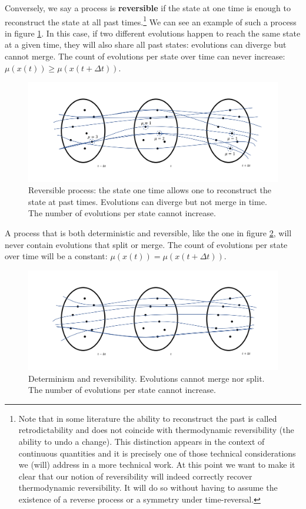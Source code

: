 \documentclass[letterpaper,twocolumn]{article}
\begin{document}
Conversely, we say a process is \textbf{reversible} if the state at one time is enough to reconstruct the state at all past times.\footnote{Note that in some literature the ability to reconstruct the past is called retrodictability and does not coincide with thermodynamic reversibility (the ability to undo a change). This distinction appears in the context of continuous quantities and it is precisely one of those technical considerations we (will) address in a more technical work. At this point we want to make it clear that our notion of reversibility will indeed correctly recover thermodynamic reversibility. It will do so without having to assume the existence of a reverse process or a symmetry under time-reversal.} We can see an example of such a process in figure \ref{fig_reversibility}. In this case, if two different evolutions happen to reach the same state at a given time, they will also share all past states: evolutions can diverge but cannot merge. The count of evolutions per state over time can never increase: $
\mu(x(t)) \geq \mu(x(t + \Delta t))$.

\begin{figure}[h!]
	\includegraphics[width=\columnwidth]{images/Slide4.png}
	\caption{Reversible process: the state one time allows one to reconstruct the state at past times. Evolutions can diverge but not merge in time. The number of evolutions per state cannot increase.}\label{fig_reversibility}
\end{figure}



A process that is both deterministic and reversible, like the one in figure \ref{fig_detrev}, will never contain evolutions that split or merge. The count of evolutions per state over time will be a constant: $\mu(x(t)) = \mu(x(t + \Delta t))$.

\begin{figure}[h!]
	\includegraphics[width=\columnwidth]{images/Slide5.png}
	\caption{Determinism and reversibility. Evolutions cannot merge nor split. The number of evolutions per state cannot increase.} \label{fig_detrev}
\end{figure}
\end{document}
